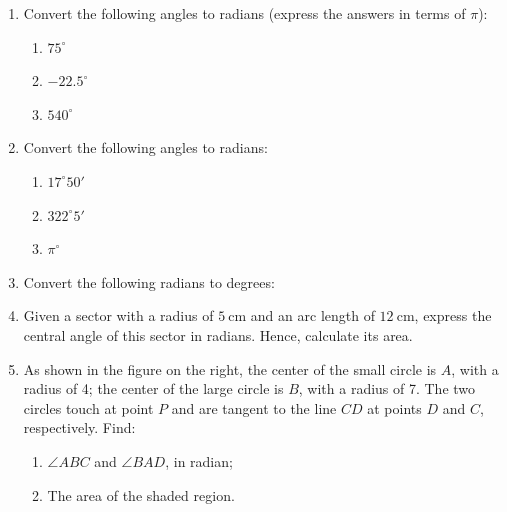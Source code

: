 \documentclass{report}
\begin{document}
\begin{enumerate}
    \item Convert the following angles to radians (express the answers in terms of $\pi$):
    \begin{multicols}{3}
        \begin{enumerate}
            \item $75^\circ$
            \item $-22.5^\circ$
            \item $540^\circ$
            \end{enumerate}
    \end{multicols}

    \item Convert the following angles to radians:
    \begin{multicols}{3}
        \begin{enumerate}
            \item $17^\circ 50'$
            \item $322^\circ 5'$
            \item $\pi^\circ$
            \end{enumerate}
    \end{multicols}

    \item Convert the following radians to degrees:
    \begin{enumerate}
    \end{enumerate}

    \item Given a sector with a radius of $5 \mathrm{~cm}$ and an arc length of $12 \mathrm{~cm}$, express the central angle of this sector in radians. Hence, calculate its area.
    
   \item \begin{multicols}{2}
    As shown in the figure on the right, the center of the small circle is $A$, with a radius of 4; the center of the large circle is $B$, with a radius of 7. The two circles touch at point $P$ and are tangent to the line $CD$ at points $D$ and $C$, respectively. Find:
    \begin{enumerate}
    \item $\angle ABC$ and $\angle BAD$, in radian;
    \item The area of the shaded region.
    \end{enumerate}


\end{multicols}
\end{enumerate}
\end{document}
